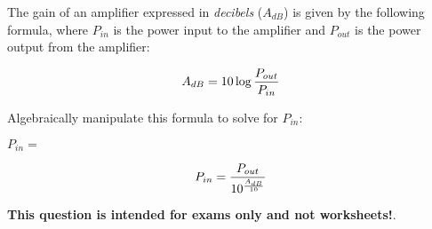 

The gain of an amplifier expressed in {\it decibels} ($A_{dB}$) is given by the following formula, where $P_{in}$ is the power input to the amplifier and $P_{out}$ is the power output from the amplifier:
 
$$A_{dB} = 10 \log {P_{out} \over P_{in}}$$

Algebraically manipulate this formula to solve for $P_{in}$:

\vskip 20pt

$P_{in} = $







$$P_{in} = {P_{out} \over 10^{A_{dB} \over 10}}$$







{\bf This question is intended for exams only and not worksheets!}.




